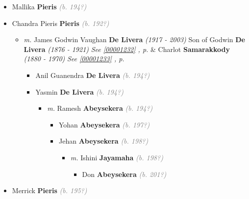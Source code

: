 \documentclass[10pt, openany]{book}
\begin{document}
\begin{itemize}
{\begin{itemize}
{\begin{itemize}
{\begin{itemize}
\item{Mallika \textbf{Pieris} \textcolor{gray}{\textit{(b. 194?)}}
 }
\item{Chandra Pieris \textbf{Pieris} \textcolor{gray}{\textit{(b. 192?)}}
\begin{itemize}
\item{\textit{m.} James Godwin Vaughan \textbf{De Livera} \textcolor{slorange}{\textit{(1917 - 2003)}} Son of  Godwin \textbf{De Livera} \textcolor{slorange}{\textit{(1876 - 1921)}} \textcolor{slteal}{\textit{See  \autoref{00001232} \textit{, p. \pageref{00001232} }}}  \&  Charlot \textbf{Samarakkody} \textcolor{slorange}{\textit{(1880 - 1970)}} \textcolor{slteal}{\textit{See  \autoref{00001233} \textit{, p. \pageref{00001233} }}}   \label{couple:00001253:00001254} \begin{itemize}
\item{Anil Guanendra  \textbf{De Livera} \textcolor{gray}{\textit{(b. 194?)}}
    }
\item{Yasmin \textbf{De Livera} \textcolor{gray}{\textit{(b. 194?)}}
\begin{itemize}
\item{\textit{m.} Ramesh \textbf{Abeysekera} \textcolor{gray}{\textit{(b. 194?)}}   \label{couple:00001256:00001257} \begin{itemize}
\item{Yohan \textbf{Abeysekera} \textcolor{gray}{\textit{(b. 197?)}}
 }
\item{Jehan \textbf{Abeysekera} \textcolor{gray}{\textit{(b. 198?)}}
\begin{itemize}
\item{\textit{m.} Ishini \textbf{Jayamaha} \textcolor{gray}{\textit{(b. 198?)}}   \label{couple:00001258:00001747} \begin{itemize}
\item{Don \textbf{Abeysekera} \textcolor{gray}{\textit{(b. 201?)}}
 }
\end{itemize}}
\end{itemize}
 }
\end{itemize}}
\end{itemize}
  }
\end{itemize}}
\end{itemize}
  }
\item{Merrick \textbf{Pieris} \textcolor{gray}{\textit{(b. 195?)}}
}
\end{itemize}}
\end{itemize}}
\end{itemize}}
\end{itemize}
\end{document}
